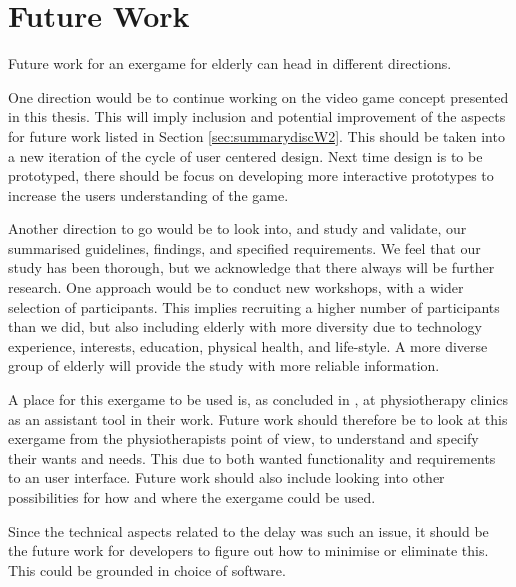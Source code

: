 \section{Future Work}

Future work for an exergame for elderly can head in different directions. 

One direction would be to continue working on the video game concept presented in this thesis. This will imply inclusion and potential improvement of the aspects for future work listed in Section \ref{sec:summarydiscW2}. This should be taken into a new iteration of the cycle of user centered design. Next time design is to be prototyped, there should be focus on developing more interactive prototypes to increase the users understanding of the game. 

Another direction to go would be to look into, and study and validate, our summarised guidelines, findings, and specified requirements. We feel that our study has been thorough, but we acknowledge that there always will be further research. One approach would be to conduct new workshops, with a wider selection of participants. This implies recruiting a higher number of participants than we did, but also including elderly with more diversity due to technology experience, interests, education, physical health, and life-style. A more diverse group of elderly will provide the study with more reliable information.   

A place for this exergame to be used is, as concluded in \cite{project}, at physiotherapy clinics as an assistant tool in their work. Future work should therefore be to look at this exergame from the physiotherapists point of view, to understand and specify their wants and needs. This due to both wanted functionality and requirements to an user interface. Future work should also include looking into other possibilities for how and where the exergame could be used.   

Since the technical aspects related to the delay was such an issue, it should be the future work for developers to figure out how to minimise or eliminate this. This could be grounded in choice of software. 
